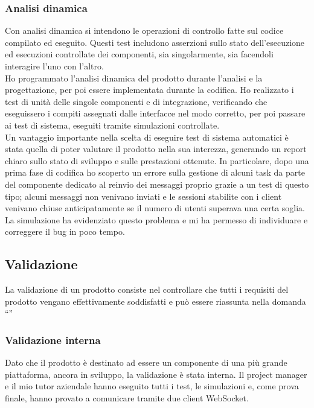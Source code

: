 		\subsubsection{Analisi dinamica}
		Con analisi dinamica si intendono le operazioni di controllo fatte sul codice compilato ed eseguito. Questi test includono asserzioni sullo stato dell'esecuzione ed esecuzioni controllate dei componenti, sia singolarmente, sia facendoli interagire l'uno con l'altro.
		\\
		Ho programmato l'analisi dinamica del prodotto durante l'analisi e la progettazione, per poi essere implementata durante la codifica. Ho realizzato i test di unità delle singole componenti e di integrazione, verificando che eseguissero i compiti assegnati dalle interfacce nel modo corretto, per poi passare ai test di sistema, eseguiti tramite simulazioni controllate.
		\\
		Un vantaggio importante nella scelta di eseguire test di sistema automatici è stata quella di poter valutare il prodotto nella sua interezza, generando un report chiaro sullo stato di sviluppo e sulle prestazioni ottenute. In particolare, dopo una prima fase di codifica ho scoperto un errore sulla gestione di alcuni task da parte del componente dedicato al reinvio dei messaggi proprio grazie a un test di questo tipo; alcuni messaggi non venivano inviati e le sessioni stabilite con i client venivano chiuse anticipatamente se il numero di utenti superava una certa soglia. La simulazione ha evidenziato questo problema e mi ha permesso di individuare e correggere il bug in poco tempo.

	\subsection{Validazione}
	La validazione di un prodotto consiste nel controllare che tutti i requisiti del prodotto vengano effettivamente soddisfatti e può essere riassunta nella domanda ``''
		\subsubsection{Validazione interna}
		Dato che il prodotto è destinato ad essere un componente di una più grande piattaforma, ancora in sviluppo, la validazione è stata interna. Il project manager e il mio tutor aziendale hanno eseguito tutti i test, le simulazioni e, come prova finale, hanno provato a comunicare tramite due client WebSocket.
